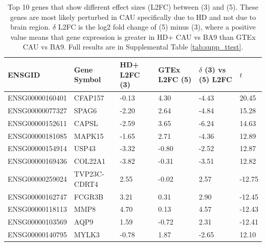 \documentclass[fleqn,10pt,table]{wlscirep}
\begin{document}
\begin{table}[]
    \centering
    \begin{tabular}{|l|l|l|l|l|l|}\hline
      ENSGID          & Gene Symbol  & HD+ L2FC (3) & GTEx L2FC (5) & $\delta$ (3) vs (5) L2FC & $t$ \\ \hline
      ENSG00000160401 & CFAP157      & -0.13        & 4.30          & -4.43                    & 20.45 \\ \hline
      ENSG00000077327 & SPAG6        & -2.20        & 2.64          & -4.84                    & 15.28 \\ \hline
      ENSG00000152611 & CAPSL        & -2.59        & 3.65          & -6.24                    & 14.63 \\ \hline
      ENSG00000181085 & MAPK15       & -1.65        & 2.71          & -4.36                    & 12.89 \\ \hline
      ENSG00000154914 & USP43        & -3.32        & -0.80         & -2.52                    & 12.87 \\ \hline
      ENSG00000169436 & COL22A1      & -3.82        & -0.31         & -3.51                    & 12.82 \\ \hline
      ENSG00000259024 & TVP23C-CDRT4 & 2.55         & -0.02         & 2.57                     & -12.75 \\ \hline
      ENSG00000162747 & FCGR3B       & 3.21         & 0.31          & 2.90                     & -12.45 \\ \hline
      ENSG00000118113 & MMP8         & 4.70         & 0.13          & 4.57                     & -12.43 \\ \hline
      ENSG00000103569 & AQP9         & 1.59         & -0.72         & 2.31                     & -12.41 \\ \hline
      ENSG00000140795 & MYLK3        & -0.78        & 1.87          & -2.65                    & 12.10 \\ \hline
    \end{tabular}
    \caption{Top 10 genes that show different effect sizes (L2FC) between (3) and (5). These genes are most likely perturbed in CAU specifically due to HD and not due to brain region. $\delta$ L2FC is the log2 fold change of (5) minus (3), where a positive value means that gene expression is greater in HD+ CAU vs BA9 than GTEx CAU vs BA9. Full results are in Supplemental Table \ref{tab:supp_ttest}.}
    \label{tab:ttest}
\end{table}
\end{document}
